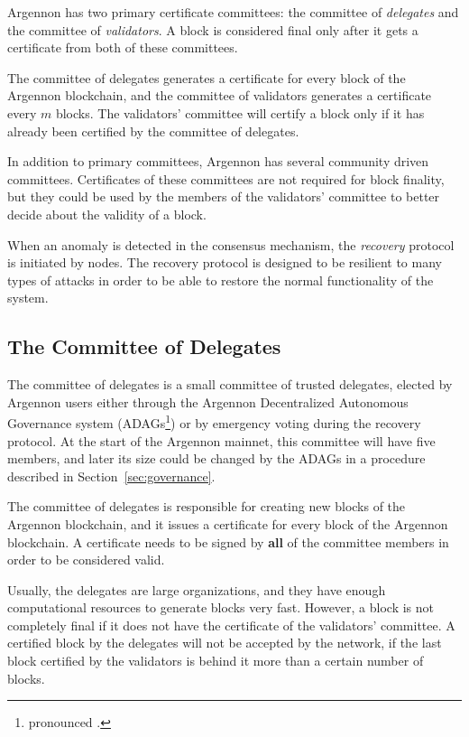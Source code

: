 
Argennon has two primary certificate committees: the committee of \emph{delegates} and the committee
of \emph{validators}. A block is considered final only after it gets a certificate from both of these committees.

The committee of delegates generates a certificate for every block of the Argennon blockchain, and the
committee of validators generates a certificate every $m$ blocks. The validators' committee will
certify a block only if it has already been certified by the committee of delegates.

In addition to primary committees, Argennon has several community driven committees. Certificates of these
committees are not required for block finality, but they could be used by the members of the
validators' committee to better decide about the validity of a block.

When an anomaly is detected in the consensus mechanism, the \emph{recovery} protocol is initiated by nodes. The
recovery protocol is designed to be resilient to many types of attacks in order to be able to restore the normal
functionality of the system.

\subsection{The Committee of Delegates}\label{subsec:the-committee-of-delegates}

The committee of delegates is a small committee of trusted delegates, elected by Argennon users either through the
Argennon Decentralized Autonomous Governance system (ADAGs\footnote{pronounced .}) or by emergency
voting during the recovery protocol. At the start of the Argennon mainnet, this committee will have
five members, and later its size could be changed by the ADAGs in a procedure described
in Section~\ref{sec:governance}.

The committee of delegates is responsible for creating new blocks of the Argennon blockchain, and it issues a
certificate for every block of the Argennon blockchain. A certificate needs to be signed
by \textbf{all} of the committee members in order to be considered valid.

Usually, the delegates are large organizations, and they have enough computational resources to generate blocks
very fast. However, a block is not completely final if it does not have the certificate of the validators' committee.
A certified block by the delegates will not be accepted by the network, if the last block certified by
the validators is behind it more than a certain number of blocks.

